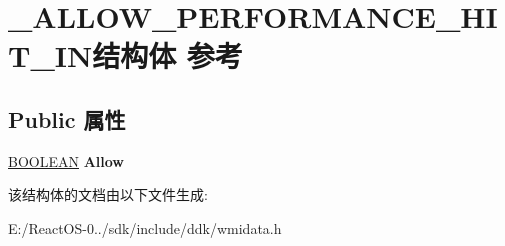 \hypertarget{struct___a_l_l_o_w___p_e_r_f_o_r_m_a_n_c_e___h_i_t___i_n}{}\section{\+\_\+\+A\+L\+L\+O\+W\+\_\+\+P\+E\+R\+F\+O\+R\+M\+A\+N\+C\+E\+\_\+\+H\+I\+T\+\_\+\+I\+N结构体 参考}
\label{struct___a_l_l_o_w___p_e_r_f_o_r_m_a_n_c_e___h_i_t___i_n}
\subsection*{Public 属性}
\begin{DoxyCompactItemize}
\item 
\mbox{\label{struct___a_l_l_o_w___p_e_r_f_o_r_m_a_n_c_e___h_i_t___i_n_a92353f2f9c6f1f3775cca5b7ea25ad15}} 
\hyperlink{_processor_bind_8h_a112e3146cb38b6ee95e64d85842e380a}{B\+O\+O\+L\+E\+AN} {\bfseries Allow}
\end{DoxyCompactItemize}


该结构体的文档由以下文件生成\+:\begin{DoxyCompactItemize}
\item 
E\+:/\+React\+O\+S-\/0../sdk/include/ddk/wmidata.\+h\end{DoxyCompactItemize}
